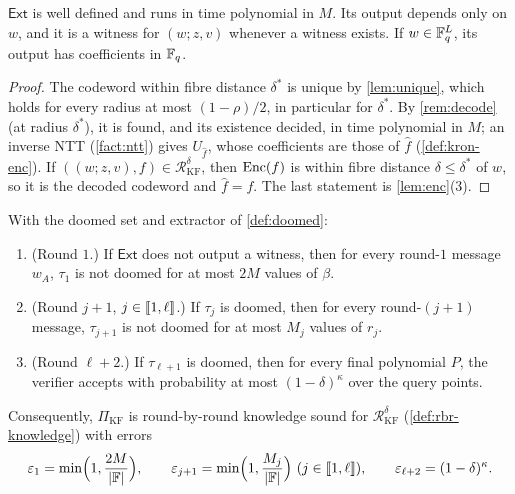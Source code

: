 \begin{lemma}\label{lem:ext}
$\mathsf{Ext}$ is well defined and runs in time polynomial in $M$. Its output depends only on $w$, and it is a witness for $(w;z,v)$ whenever a witness exists. If $w \in \mathbb{F}_q^L$, its output has coefficients in $\mathbb{F}_q$.
\end{lemma}

\begin{proof}
The codeword within fibre distance $\delta^*$ is unique by \cref{lem:unique}, which holds for every radius at most $(1-\rho)/2$, in particular for $\delta^*$. By \cref{rem:decode} (at radius $\delta^*$), it is found, and its existence decided, in time polynomial in $M$; an inverse NTT (\cref{fact:ntt}) gives $U_{\hat f}$, whose coefficients are those of $\hat f$ (\cref{def:kron-enc}).
If $((w;z,v),f) \in \mathcal{R}^\delta_{\mathrm{KF}}$, then $\mathrm{Enc}(f)$ is within fibre distance $\delta \le \delta^*$ of $w$, so it is the decoded codeword and $\hat f = f$.
The last statement is \cref{lem:enc}(3).
\end{proof}

\begin{theorem}\label{thm:rbr}
With the doomed set and extractor of \cref{def:doomed}:
\begin{enumerate}
  \item (Round $1$.) If $\mathsf{Ext}$ does not output a witness, then for every round-$1$ message $w_A$, $\tau_1$ is not doomed for at most $2M$ values of $\beta$.
  \item (Round $j+1$, $j \in \llbracket 1, \ell \rrbracket$.) If $\tau_j$ is doomed, then for every round-$(j+1)$ message, $\tau_{j+1}$ is not doomed for at most $M_j$ values of $r_j$.
  \item (Round $\ell+2$.) If $\tau_{\ell+1}$ is doomed, then for every final polynomial $P$, the verifier accepts with probability at most $(1-\delta)^\kappa$ over the query points.
\end{enumerate}
Consequently, $\Pi_{\mathrm{KF}}$ is round-by-round knowledge sound for $\mathcal{R}^\delta_{\mathrm{KF}}$ (\cref{def:rbr-knowledge}) with errors
\[
  \varepsilon_1 = \min\Bigl(1, \frac{2M}{|\mathbb{F}|}\Bigr), \qquad \varepsilon_{j+1} = \min\Bigl(1, \frac{M_j}{|\mathbb{F}|}\Bigr) \ (j \in \llbracket 1, \ell \rrbracket), \qquad \varepsilon_{\ell+2} = (1-\delta)^\kappa .
\]
\end{theorem}

